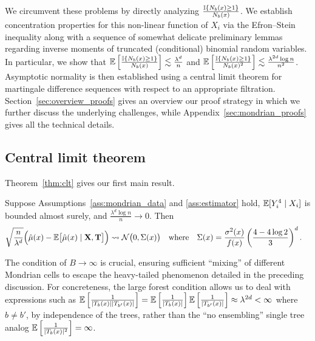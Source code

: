 We circumvent these problems by directly analyzing
$\frac{\mathbb{I}\{N_b(x) \geq 1\}}{N_b(x)}$.
We establish concentration properties
for this non-linear function of $X_i$ via the Efron--Stein inequality
\citep[Section 3.1]{boucheron2016concentration}
along with a sequence of somewhat delicate preliminary lemmas regarding
inverse moments of truncated (conditional) binomial random variables.
In particular, we show that
$\mathbb{E} \left[ \frac{\mathbb{I} \{N_b(x) \geq 1\}}{N_b(x)} \right]
\lesssim \frac{\lambda^d}{n}$
and
$\mathbb{E} \left[ \frac{\mathbb{I} \{N_b(x) \geq 1\}}{N_b(x)^2} \right]
\lesssim \frac{\lambda^{2d} \log n}{n^2}$.
Asymptotic normality is then established
using a central limit theorem for martingale difference sequences
\citep[Theorem~3.2]{hall2014martingale}
with respect to an appropriate filtration.
Section~\ref{sec:overview_proofs} gives an overview our proof strategy in
which  we further discuss the underlying challenges,
while Appendix~\ref{sec:mondrian_proofs} gives all the technical details.

\subsection{Central limit theorem}

Theorem~\ref{thm:clt} gives our first main result.

\begin{theorem}%
  \label{thm:clt}
  Suppose Assumptions~\ref{ass:mondrian_data} and \ref{ass:estimator} hold,
  $\mathbb{E}[Y_i^4 \mid X_i ]$ is bounded almost surely,
  and $\frac{\lambda^d \log n}{n} \to 0$. Then
  \begin{align*}
    \sqrt{\frac{n}{\lambda^d}}
    \Big(
      \hat \mu(x)
      - \mathbb{E} \big[ \hat \mu(x) \mid \mathbf{X}, \mathbf{T} \big]
    \Big)
    &\rightsquigarrow
    \mathcal{N}\big(0, \Sigma(x)\big)
    &                &\text{where}
    &\Sigma(x)
    &=
    \frac{\sigma^2(x)}{f(x)}
    \left(
      \frac{4 - 4 \log 2}{3 }
    \right)^d.
  \end{align*}
\end{theorem}

The condition of $B \to \infty$ is crucial,
ensuring sufficient ``mixing'' of different Mondrian cells to escape the
heavy-tailed phenomenon detailed in the preceding discussion.
For concreteness, the large forest condition allows us to deal
with expressions such as
$\mathbb{E} \left[ \frac{1}{|T_b(x)| |T_{b'}(x)|} \right] =
\mathbb{E} \left[ \frac{1}{|T_b(x)|} \right] \mathbb{E} \left[ \frac{1}{|T_{b'}(x)|} \right]
\approx \lambda^{2d} < \infty$
where $b \neq b'$, by independence of the trees, rather than
the ``no ensembling'' single tree analog
$\mathbb{E} \left[ \frac{1}{|T_b(x)|^2} \right] = \infty$.

